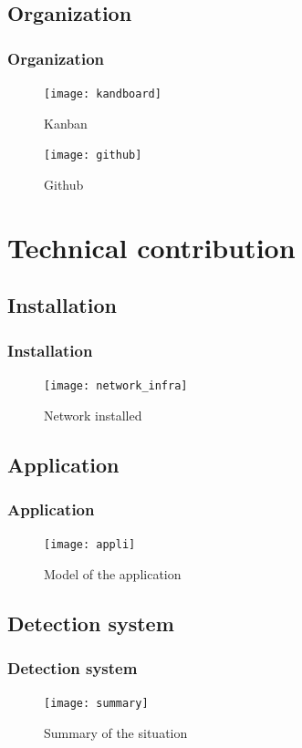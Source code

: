 \documentclass[10pt, svgnames, compress, red]{beamer}
\newcounter{th}[section]
\begin{document}
\subsection{Organization}
\begin{frame}
  \frametitle{Organization}
  \begin{minipage}[h]{0.45\linewidth}
    \begin{figure}[h]
      \centering
      \texttt{[image: kandboard]}
      \caption{Kanban}
    \end{figure}
  \end{minipage}\hfill
  \begin{minipage}[h]{0.45\linewidth}
    \begin{figure}[h]
      \centering
      \texttt{[image: github]}
      \caption{Github}
    \end{figure}
  \end{minipage}
\transdissolve[duration=0.1]
\end{frame}

\section{Technical contribution}

\subsection{Installation}
\begin{frame}
  \frametitle{Installation}
  \begin{figure}[h]
    \centering
    \texttt{[image: network\_infra]}
    \caption{Network installed}
  \end{figure}
\transdissolve[duration=0.1]
\end{frame}

\subsection{Application}
\begin{frame}
  \frametitle{Application}
  \begin{figure}[h]
    \centering
    \texttt{[image: appli]}
    \caption{Model of the application}
    \label{fig:model}
  \end{figure}
\transdissolve[duration=0.1]
\end{frame}


\subsection{Detection system}
\begin{frame}
  \frametitle{Detection system}
  \begin{figure}[h]
    \centering
    \texttt{[image: summary]}
    \caption{Summary of the situation}
  \end{figure}
\transdissolve[duration=0.1]
\end{frame}
\end{document}

